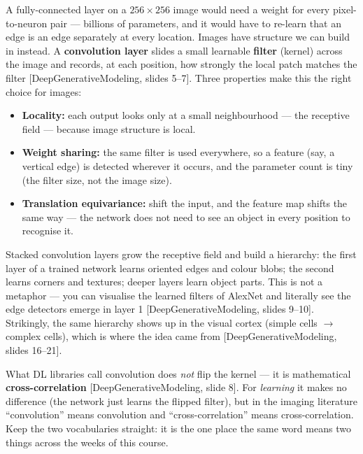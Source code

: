 \documentclass[11pt]{article}
\newcommand{\deck}[1]{\textsf{\small[#1]}}
\begin{document}
A fully-connected layer on a $256\times256$ image would need a weight for every
pixel-to-neuron pair --- billions of parameters, and it would have to re-learn
that an edge is an edge separately at every location. Images have structure we
can build in instead. A \textbf{convolution layer} slides a small learnable
\textbf{filter} (kernel) across the image and records, at each position, how
strongly the local patch matches the filter \deck{DeepGenerativeModeling, slides
5--7}. Three properties make this the right choice for images:
\begin{itemize}[nosep,leftmargin=*]
  \item \textbf{Locality:} each output looks only at a small neighbourhood ---
  the receptive field --- because image structure is local.
  \item \textbf{Weight sharing:} the same filter is used everywhere, so a feature
  (say, a vertical edge) is detected wherever it occurs, and the parameter count
  is tiny (the filter size, not the image size).
  \item \textbf{Translation equivariance:} shift the input, and the feature map
  shifts the same way --- the network does not need to see an object in every
  position to recognise it.
\end{itemize}
Stacked convolution layers grow the receptive field and build a hierarchy: the
first layer of a trained network learns oriented edges and colour blobs; the
second learns corners and textures; deeper layers learn object parts. This is not
a metaphor --- you can visualise the learned filters of AlexNet and literally see
the edge detectors emerge in layer 1 \deck{DeepGenerativeModeling, slides
9--10}. Strikingly, the same hierarchy shows up in the visual cortex (simple
cells $\to$ complex cells), which is where the idea came from
\deck{DeepGenerativeModeling, slides 16--21}.

\begin{notebox}
What DL libraries call convolution does \emph{not} flip the kernel --- it is
mathematical \textbf{cross-correlation} \deck{DeepGenerativeModeling, slide 8}.
For \emph{learning} it makes no difference (the network just learns the flipped
filter), but in the imaging literature ``convolution'' means convolution and
``cross-correlation'' means cross-correlation. Keep the two vocabularies
straight: it is the one place the same word means two things across the weeks of
this course.
\end{notebox}
\end{document}

